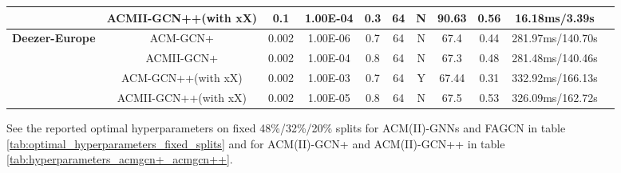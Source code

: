 \documentclass{article}
\newcommand{\0}{{\boldsymbol{0}}}
\newcommand{\6}{{\partial}}
\newcommand{\8}{{\infty}}
\newcommand{\4}{{\nabla}}
\begin{document}
\begin{table}[htbp]
{\begin{tabular}{c|c|ccccccccc}
          & ACMII-GCN++(with xX) & 0.1   & 1.00E-04 & 0.3   & 64    & N     & 90.63 & 0.56  & 16.18ms/3.39s \\
    \midrule
    \multicolumn{1}{c|}{\multirow{4}[2]{*}{\textbf{Deezer-Europe }}} & ACM-GCN+ & 0.002 & 1.00E-06 & 0.7   & 64    & N     & 67.4  & 0.44  & 281.97ms/140.70s \\
          & ACMII-GCN+ & 0.002 & 1.00E-04 & 0.8   & 64    & N     & 67.3  & 0.48  & 281.48ms/140.46s \\
          & ACM-GCN++(with xX) & 0.002 & 1.00E-03 & 0.7   & 64    & Y     & 67.44 & 0.31  & 332.92ms/166.13s \\
          & ACMII-GCN++(with xX) & 0.002 & 1.00E-05 & 0.8   & 64    & N     & 67.5  & 0.53  & 326.09ms/162.72s \\
    \bottomrule
    \bottomrule
    \end{tabular}\label{tab:optimal_hyperparameter_random_splits_acmgcn+_acmgcn++}}
\end{table} See the reported optimal hyperparameters on fixed 48\%/32\%/20\% splits for ACM(II)-GNNs and FAGCN in table \ref{tab:optimal_hyperparameters_fixed_splits} and for ACM(II)-GCN+ and ACM(II)-GCN++ in table \ref{tab:hyperparameters_acmgcn+_acmgcn++}.
\end{document}
